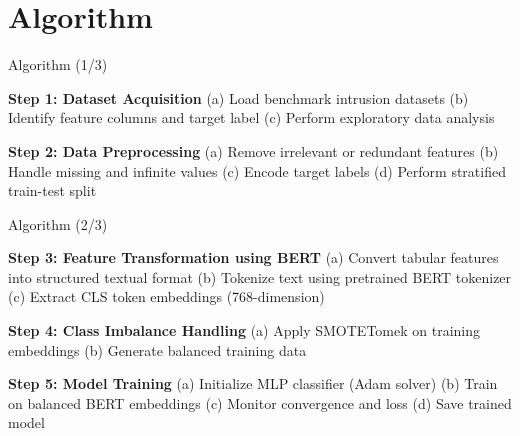 \documentclass[aspectratio=169,xcolor=dvipsnames]{beamer}
\begin{document}
\section{Algorithm}

\begin{frame}{Algorithm (1/3)}
\begin{algorithm}[H]
\small
\begin{algorithmic}

  \State \textbf{Step 1: Dataset Acquisition}
  \State \hspace{1.2em}(a) Load benchmark intrusion datasets
  \State \hspace{1.2em}(b) Identify feature columns and target label
  \State \hspace{1.2em}(c) Perform exploratory data analysis

  \State \textbf{Step 2: Data Preprocessing}
  \State \hspace{1.2em}(a) Remove irrelevant or redundant features
  \State \hspace{1.2em}(b) Handle missing and infinite values
  \State \hspace{1.2em}(c) Encode target labels
  \State \hspace{1.2em}(d) Perform stratified train-test split

\end{algorithmic}
\end{algorithm}
\end{frame}


\begin{frame}{Algorithm (2/3)}
\begin{algorithm}[H]
\small
\begin{algorithmic}

  \State \textbf{Step 3: Feature Transformation using BERT}
  \State \hspace{1.2em}(a) Convert tabular features into structured textual format
  \State \hspace{1.2em}(b) Tokenize text using pretrained BERT tokenizer
  \State \hspace{1.2em}(c) Extract CLS token embeddings (768-dimension)

  \State \textbf{Step 4: Class Imbalance Handling}
  \State \hspace{1.2em}(a) Apply SMOTETomek on training embeddings
  \State \hspace{1.2em}(b) Generate balanced training data

  \State \textbf{Step 5: Model Training}
  \State \hspace{1.2em}(a) Initialize MLP classifier (Adam solver)
  \State \hspace{1.2em}(b) Train on balanced BERT embeddings
  \State \hspace{1.2em}(c) Monitor convergence and loss
  \State \hspace{1.2em}(d) Save trained model
\end{algorithmic}
\end{algorithm}
\end{frame}
\end{document}
